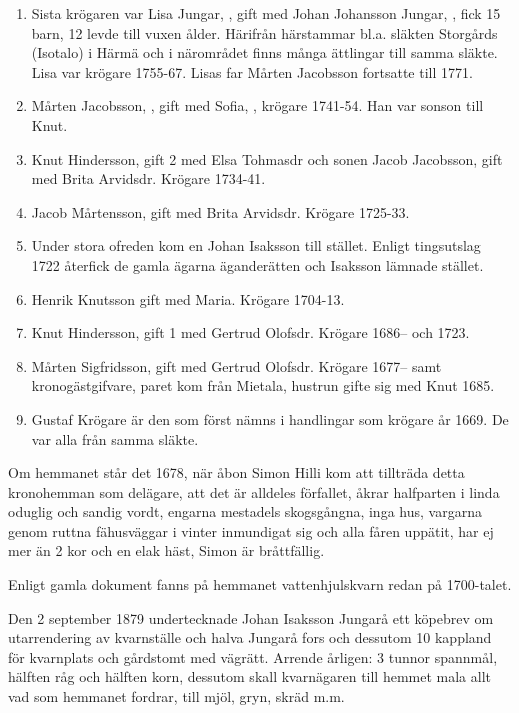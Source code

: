 \begin{enumerate}
  \item Sista krögaren var Lisa Jungar, , gift med Johan Johansson Jungar, , fick 15 barn, 12 levde till vuxen ålder. Härifrån härstammar bl.a. släkten  Storgårds (Isotalo) i Härmä och i närområdet finns många ättlingar till samma släkte. Lisa var krögare 1755-67. Lisas far Mårten Jacobsson fortsatte till 1771.
  \item Mårten Jacobsson, , gift med Sofia, , krögare 1741-54. Han var sonson till Knut.
  \item Knut Hindersson, gift 2 med Elsa Tohmasdr och sonen Jacob Jacobsson, gift med Brita Arvidsdr. Krögare 1734-41.
  \item Jacob Mårtensson, gift med Brita Arvidsdr. Krögare 1725-33.
  \item Under stora ofreden kom en Johan Isaksson till stället. Enligt tingsutslag 1722 återfick de gamla ägarna äganderätten och Isaksson lämnade stället.
  \item Henrik Knutsson gift med Maria. Krögare 1704-13.
  \item Knut Hindersson, gift 1 med Gertrud Olofsdr. Krögare 1686-- och 1723.
  \item Mårten Sigfridsson, gift med Gertrud Olofsdr. Krögare 1677-- samt kronogästgifvare, paret kom från Mietala, hustrun gifte sig med Knut 1685.
  \item Gustaf Krögare är den som först nämns i handlingar som krögare år 1669. De var alla från samma släkte.
\end{enumerate}

Om hemmanet står det 1678, när åbon Simon Hilli kom att tillträda detta kronohemman som delägare, att det är alldeles förfallet, åkrar halfparten i linda oduglig och sandig vordt, engarna mestadels skogsgångna, inga hus, vargarna genom ruttna fähusväggar i vinter inmundigat sig och alla fåren uppätit, har ej mer än 2 kor och en elak häst, Simon är bråttfällig.






Enligt gamla dokument fanns på hemmanet vattenhjulskvarn redan på 1700-talet.

Den 2 september 1879 undertecknade Johan Isaksson Jungarå ett köpebrev om utarrendering av kvarnställe och halva Jungarå fors och dessutom 10 kappland för kvarnplats och gårdstomt med vägrätt. Arrende årligen: 3 tunnor spannmål, hälften råg och hälften korn, dessutom skall kvarnägaren till hemmet mala allt vad som hemmanet fordrar, till mjöl, gryn, skräd m.m.

